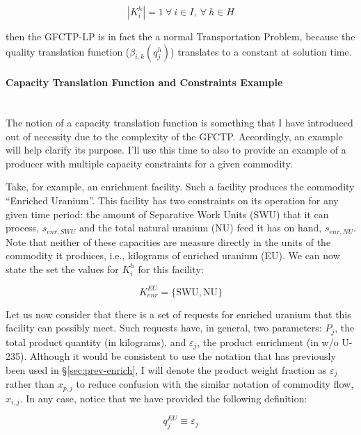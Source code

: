 \begin{equation}\label{eqs:1constraint}
  \left|{K_{i}^{h}}\right| = 1 \: \forall \: i \in I, \: \forall \: h \in H
\end{equation}

then the GFCTP-LP is in fact the a normal Transportation Problem, because the
quality translation function ($\beta_{i,k}(q_{j}^{h})$) translates to a constant
at solution time.

\paragraph{Capacity Translation Function and Constraints Example}~\\

The notion of a capacity translation function is something that I have
introduced out of necessity due to the complexity of the GFCTP. Accordingly, an
example will help clarify its purpose. I'll use this time to also to provide an
example of a producer with multiple capacity constraints for a given commodity.

Take, for example, an enrichment facility. Such a facility produces the
commodity ``Enriched Uranium''. This facility has two constraints on its
operation for any given time period: the amount of Separative Work Units (SWU)
that it can process, $s_{enr,SWU}$ and the total natural uranium (NU) feed it
has on hand, $s_{enr,NU}$. Note that neither of these capacities are measure
directly in the units of the commodity it produces, i.e., kilograms of enriched
uranium (EU). We can now state the set the values for $K_{i}^{h}$ for this
facility:

\begin{equation}\label{eqs:enr-constr-commods}
  K_{enr}^{EU} = \{ \mbox{SWU}, \mbox{NU} \}
\end{equation}

Let us now consider that there is a set of requests for enriched uranium that
this facility can possibly meet. Such requests have, in general, two parameters:
$P_{j}$, the total product quantity (in kilograms), and $\varepsilon_{j}$, the
product enrichment (in w/o U-235). Although it would be consistent to use the
notation that has previously been used in \S\ref{sec:prev-enrich}, I will denote
the product weight fraction as $\varepsilon_{j}$ rather than $x_{p,j}$ to reduce
confusion with the similar notation of commodity flow, $x_{i,j}$. In any case,
notice that we have provided the following definition:

\begin{equation}\label{eqs:enr-q-swu}
  q_{j}^{EU} \equiv \varepsilon_{j}
\end{equation}

